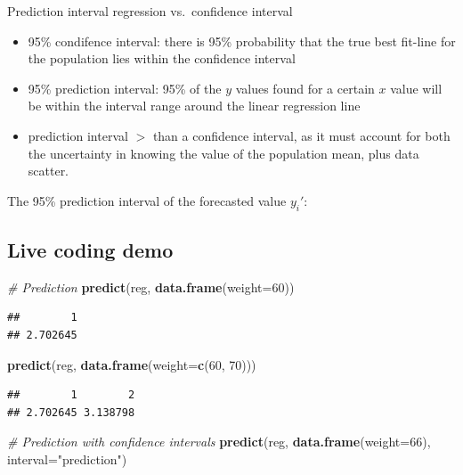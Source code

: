 \documentclass[]{article}
\newenvironment{Shaded}{\begin{snugshade}}{\end{snugshade}}
\newcommand{\CommentTok}[1]{\textcolor[rgb]{0.56,0.35,0.01}{\textit{#1}}}
\newcommand{\DataTypeTok}[1]{\textcolor[rgb]{0.13,0.29,0.53}{#1}}
\newcommand{\DecValTok}[1]{\textcolor[rgb]{0.00,0.00,0.81}{#1}}
\newcommand{\KeywordTok}[1]{\textcolor[rgb]{0.13,0.29,0.53}{\textbf{#1}}}
\newcommand{\NormalTok}[1]{#1}
\newcommand{\StringTok}[1]{\textcolor[rgb]{0.31,0.60,0.02}{#1}}
\providecommand{\tightlist}{%
  \setlength{\itemsep}{0pt}\setlength{\parskip}{0pt}}
\begin{document}
Prediction interval regression vs.~confidence interval

\begin{itemize}
\tightlist
\item
  95\% condifence interval: there is 95\% probability that the true best
  fit-line for the population lies within the confidence interval
\item
  95\% prediction interval: 95\% of the \(y\) values found for a certain
  \(x\) value will be within the interval range around the linear
  regression line
\item
  prediction interval \(>\) than a confidence interval, as it must
  account for both the uncertainty in knowing the value of the
  population mean, plus data scatter.
\end{itemize}

The 95\% prediction interval of the forecasted value \(y_i'\):

\hypertarget{live-coding-demo-1}{%
\subsection{Live coding demo}\label{live-coding-demo-1}}

\begin{Shaded}
\begin{Highlighting}[]
\CommentTok{# Prediction}
\KeywordTok{predict}\NormalTok{(reg, }\KeywordTok{data.frame}\NormalTok{(}\DataTypeTok{weight=}\DecValTok{60}\NormalTok{))}
\end{Highlighting}
\end{Shaded}

\begin{verbatim}
##        1 
## 2.702645
\end{verbatim}

\begin{Shaded}
\begin{Highlighting}[]
\KeywordTok{predict}\NormalTok{(reg, }\KeywordTok{data.frame}\NormalTok{(}\DataTypeTok{weight=}\KeywordTok{c}\NormalTok{(}\DecValTok{60}\NormalTok{, }\DecValTok{70}\NormalTok{)))}
\end{Highlighting}
\end{Shaded}

\begin{verbatim}
##        1        2 
## 2.702645 3.138798
\end{verbatim}

\begin{Shaded}
\begin{Highlighting}[]
\CommentTok{# Prediction with confidence intervals}
\KeywordTok{predict}\NormalTok{(reg, }\KeywordTok{data.frame}\NormalTok{(}\DataTypeTok{weight=}\DecValTok{66}\NormalTok{), }\DataTypeTok{interval=}\StringTok{"prediction"}\NormalTok{)}
\end{Highlighting}
\end{Shaded}
\end{document}
